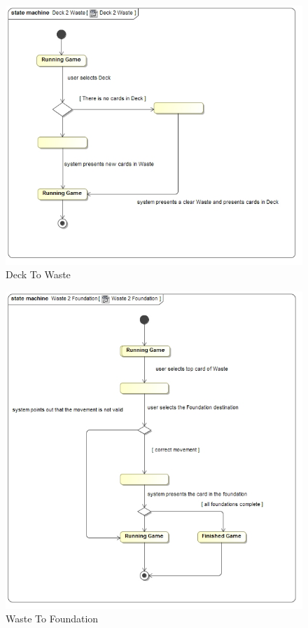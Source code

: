 \documentclass[11pt]{article}
\begin{document}
\begin{center}
 \begin{figure}[H]
 \begin{center}
   \includegraphics[width=14cm]{DomainModel/Deck2Waste.jpg}
   \caption{Deck To Waste}
   \label{fig:deck2waste}
 \end{center}
 \end{figure}
\end{center}
\begin{center}

\begin{figure}[H]
 \begin{center}
   \includegraphics[width=14cm]{DomainModel/Waste2Foundation.jpg}
   \caption{Waste To Foundation}
   \label{fig:waste2foundation}
 \end{center}
 \end{figure}
\end{center}
\end{document}
